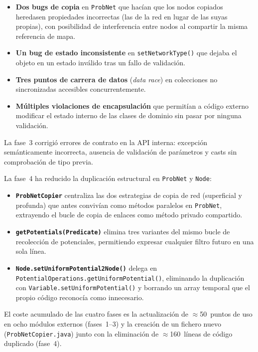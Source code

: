 \documentclass[11pt,a4paper]{article}
\newcommand{\code}[1]{\texttt{#1}}
\begin{document}
\begin{itemize}
  \item \textbf{Dos bugs de copia} en \code{ProbNet} que hacían que los nodos
    copiados heredasen propiedades incorrectas (las de la red en lugar de
    las suyas propias), con posibilidad de interferencia entre nodos al
    compartir la misma referencia de mapa.

  \item \textbf{Un bug de estado inconsistente} en \code{setNetworkType()} que
    dejaba el objeto en un estado inválido tras un fallo de validación.

  \item \textbf{Tres puntos de carrera de datos} (\emph{data race}) en
    colecciones no sincronizadas accesibles concurrentemente.

  \item \textbf{Múltiples violaciones de encapsulación} que permitían a
    código externo modificar el estado interno de las clases de dominio
    sin pasar por ninguna validación.
\end{itemize}

La fase~3 corrigió errores de contrato en la API interna: excepción
semánticamente incorrecta, ausencia de validación de parámetros y casts
sin comprobación de tipo previa.

La fase~4 ha reducido la duplicación estructural en \code{ProbNet} y
\code{Node}:

\begin{itemize}
  \item \textbf{\code{ProbNetCopier}} centraliza las dos estrategias de copia
    de red (superficial y profunda) que antes convivían como métodos
    paralelos en \code{ProbNet}, extrayendo el bucle de copia de enlaces
    como método privado compartido.

  \item \textbf{\code{getPotentials(Predicate)}} elimina tres variantes
    del mismo bucle de recolección de potenciales, permitiendo expresar
    cualquier filtro futuro en una sola línea.

  \item \textbf{\code{Node.setUniformPotential2Node()}} delega en
    \code{PotentialOperations.getUniformPotential()}, eliminando la
    duplicación con \code{Variable.setUniformPotential()} y borrando
    un array temporal que el propio código reconocía como innecesario.
\end{itemize}

El coste acumulado de las cuatro fases es la actualización de
$\approx$50~puntos de uso en ocho módulos externos (fases~1--3) y la
creación de un fichero nuevo (\code{ProbNetCopier.java}) junto con la
eliminación de $\approx$160~líneas de código duplicado (fase~4).
\end{document}
